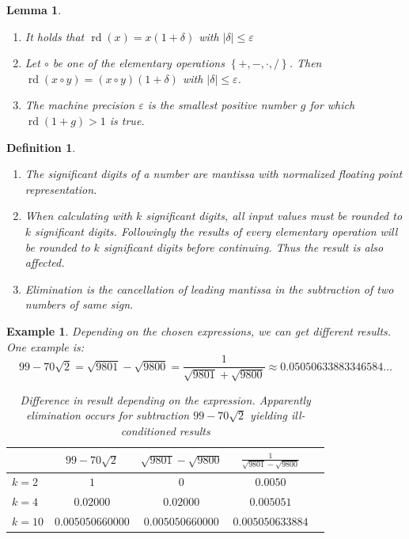 \documentclass[a4paper]{article}
\newcounter{lecref}[section]
\numberwithin{lecref}{section}
\theoremstyle{break}
\newtheorem{example}[lecref]{Example}
\newtheorem{definition}[lecref]{Definition}
\newtheorem{lemma}[lecref]{Lemma}
\newcommand{\Abs}[1]{\left|#1\right|}
\newcommand{\Set}[1]{\left\{#1\right\}}
\begin{document}
\begin{lemma}
  \label{lemma:2-4}
  \begin{enumerate}
    \item It holds that $\operatorname{rd}(x) = x (1 + \delta)$ with $\Abs{\delta} \leq \varepsilon$
    \item Let $\circ$ be one of the elementary operations $\Set{+, -, \cdot, /}$. Then $\operatorname{rd}(x \circ y) = (x \circ y)(1 + \delta)$ with $\Abs{\delta} \leq \varepsilon$.
    \item The machine precision $\varepsilon$ is the smallest positive number $g$ for which $\operatorname{rd}(1 + g) > 1$ is true.
  \end{enumerate}
\end{lemma}

\begin{definition}\hfill{}
  \label{definition:2-5}
  \begin{enumerate}
    \item The significant digits of a number are mantissa with normalized floating point representation.
    \item When calculating with $k$ significant digits, all input values must be rounded to $k$ significant digits.
      Followingly the results of every elementary operation will be rounded to $k$ significant digits before continuing.
      Thus the result is also affected.
    \item Elimination is the cancellation of leading mantissa in the subtraction of two numbers of same sign. 
  \end{enumerate}
\end{definition}

\begin{example}
  Depending on the chosen expressions, we can get different results. One example is:
  \[ 99 - 70\sqrt{2} = \sqrt{9801} - \sqrt{9800} = \frac{1}{\sqrt{9801} + \sqrt{9800}} \approx 0.05050633883346584\dots \]
  \begin{table}[!ht]
    \begin{center}
      \begin{tabular}{lcccc}
               & $99-70\sqrt 2$ & $\sqrt{9801} - \sqrt{9800}$ & $\frac{1}{\sqrt{9801} - \sqrt{9800}}$ \\
      \hline
        $k=2$  & $1$ & $0$ & $0.0050$ \\
        $k=4$  & $0.02000$ & $0.02000$ & $0.005051$ \\
        $k=10$ & $0.005050660000$ & $0.005050660000$ & $0.005050633884$
      \end{tabular}
      \caption{Difference in result depending on the expression. Apparently elimination occurs for subtraction $99-70\sqrt 2$ yielding ill-conditioned results}
    \end{center}
  \end{table}
\end{example}
\end{document}

